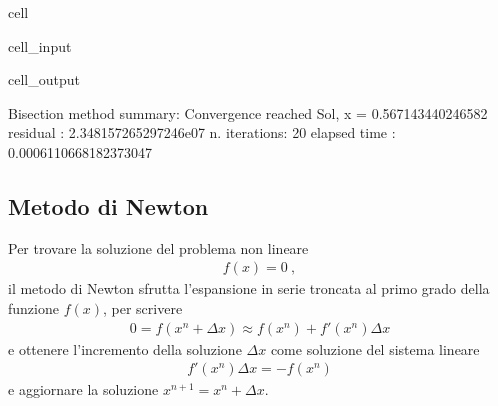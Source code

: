 \documentclass[letterpaper,10pt,italian]{jupyterBook}
\begin{document}
\begin{sphinxuseclass}{cell}
\begin{sphinxVerbatimInput}
\begin{sphinxuseclass}{cell_input}
\end{sphinxuseclass}\end{sphinxVerbatimInput}
\begin{sphinxVerbatimOutput}

\begin{sphinxuseclass}{cell_output}
\begin{sphinxVerbatim}[commandchars=\\\{\}]
Bisection method summary: 
Convergence reached
Sol, x = \PYGZhy{}0.567143440246582
residual     : \PYGZhy{}2.348157265297246e\PYGZhy{}07
n. iterations: 20
elapsed time : 0.0006110668182373047
\end{sphinxVerbatim}

\end{sphinxuseclass}\end{sphinxVerbatimOutput}

\end{sphinxuseclass}

\subsection{Metodo di Newton}
\label{\detokenize{ch/numerics/nonlinear:metodo-di-newton}}
\sphinxAtStartPar
Per trovare la soluzione del problema non lineare
\begin{equation*}
\begin{split}f(x) = 0 \ ,\end{split}
\end{equation*}
\sphinxAtStartPar
il metodo di Newton sfrutta l’espansione in serie troncata al primo grado della funzione \(f(x)\), per scrivere
\begin{equation*}
\begin{split}0 = f(x^n + \Delta x) \approx f(x^n) + f'(x^n) \Delta x \end{split}
\end{equation*}
\sphinxAtStartPar
e ottenere l’incremento della soluzione \(\Delta x\) come soluzione del sistema lineare
\begin{equation*}
\begin{split}f'(x^n) \Delta x = -f(x^n)\end{split}
\end{equation*}
\sphinxAtStartPar
e aggiornare la soluzione \(x^{n+1} = x^{n} + \Delta x\).
\end{document}
